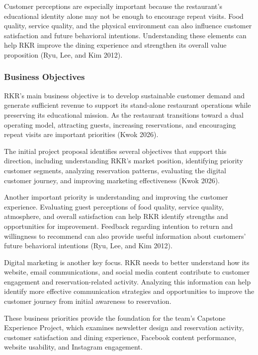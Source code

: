 \documentclass[
  12pt,
  letterpaper,
  DIV=11,
  numbers=noendperiod]{scrartcl}
\begin{document}
Customer perceptions are especially important because the restaurant's
educational identity alone may not be enough to encourage repeat visits.
Food quality, service quality, and the physical environment can also
influence customer satisfaction and future behavioral intentions.
Understanding these elements can help RKR improve the dining experience
and strengthen its overall value proposition (Ryu, Lee, and Kim 2012).

\subsubsection{Business Objectives}\label{business-objectives}

RKR's main business objective is to develop sustainable customer demand
and generate sufficient revenue to support its stand-alone restaurant
operations while preserving its educational mission. As the restaurant
transitions toward a dual operating model, attracting guests, increasing
reservations, and encouraging repeat visits are important priorities
(Kwok 2026).

The initial project proposal identifies several objectives that support
this direction, including understanding RKR's market position,
identifying priority customer segments, analyzing reservation patterns,
evaluating the digital customer journey, and improving marketing
effectiveness (Kwok 2026).

Another important priority is understanding and improving the customer
experience. Evaluating guest perceptions of food quality, service
quality, atmosphere, and overall satisfaction can help RKR identify
strengths and opportunities for improvement. Feedback regarding
intention to return and willingness to recommend can also provide useful
information about customers' future behavioral intentions (Ryu, Lee, and
Kim 2012).

Digital marketing is another key focus. RKR needs to better understand
how its website, email communications, and social media content
contribute to customer engagement and reservation-related activity.
Analyzing this information can help identify more effective
communication strategies and opportunities to improve the customer
journey from initial awareness to reservation.

These business priorities provide the foundation for the team's Capstone
Experience Project, which examines newsletter design and reservation
activity, customer satisfaction and dining experience, Facebook content
performance, website usability, and Instagram engagement.
\end{document}
